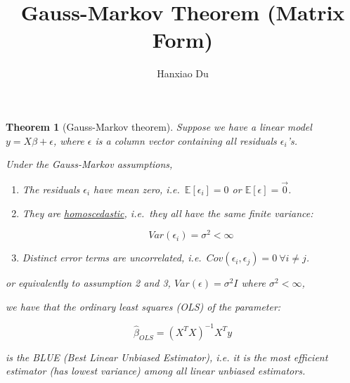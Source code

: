 \documentclass[12pt,a4paper]{article}
\title{Gauss-Markov Theorem (Matrix Form)}
\author{Hanxiao Du}
\date{}
\newtheorem{theorem}{Theorem}
\begin{document}
\maketitle

\begin{theorem}[Gauss-Markov theorem]

Suppose we have a linear model \(y=X\beta+\epsilon\), where \(\epsilon\)
is a column vector containing all residuals \(\epsilon_i\)'s.

Under the Gauss-Markov assumptions,

\begin{enumerate}
\def\labelenumi{\arabic{enumi}.}
\item
  \label{assumption1}The residuals \(\epsilon_i\) have mean zero,
  i.e.~\(\mathbb{E}[\epsilon_i]=0\) or \(\mathbb{E}[\epsilon]=\vec{0}\).
\item
  They are
  \href{https://en.wikipedia.org/wiki/Homoscedasticity}{homoscedastic},
  i.e.~they all have the same finite variance:

  \[Var(\epsilon_i)=\sigma^2<\infty\]
\item
  Distinct error terms are uncorrelated,
  i.e.~\(Cov(\epsilon_i, \epsilon_j)=0\ \forall i\neq j\).
\end{enumerate}

or equivalently to assumption 2 and 3, \(Var(\epsilon) =\sigma^2I\)
where \(\sigma^2<\infty\),

we have that the ordinary least squares (OLS) of the parameter:

\[\hat\beta_{OLS}=(X^TX)^{-1}X^Ty\]

is the BLUE (Best Linear Unbiased Estimator), i.e. it is the most
efficient estimator (has lowest variance) among all linear unbiased estimators.

\end{theorem}
\bigskip
\end{document}

